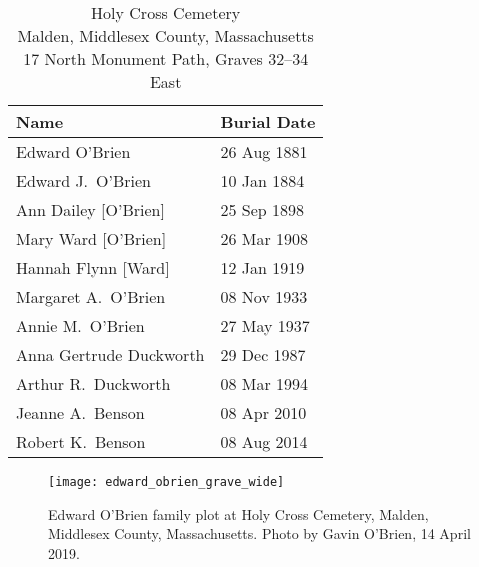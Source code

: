 \begin{table}[ht]
	\centering
	\caption{Holy Cross Cemetery\cite{HolyCrossPlot} \\
		Malden, Middlesex County, Massachusetts
		17 North Monument Path, Graves 32--34 East}
	\begin{tabular}{|l|l|}
		\hline
		\textbf{Name} & \textbf{Burial Date} \\
	\hline
	Edward O'Brien\index{O'Brien!Edward/Edmund\textsuperscript{2}} & 26 Aug 1881 \\
	\hline
	Edward J.\ O'Brien\index{O'Brien!Edward\textsuperscript{3} (1861--1884)} & 10 Jan 1884 \\
	\hline
	Ann Dailey [O'Brien]\index{O'Brien!Ann\textsuperscript{2}}\index{Dailey!Ann\textsuperscript{2} (O'Brien)} & 25 Sep 1898 \\
	\hline
	Mary Ward [O'Brien]\index{O'Brien!Mary\textsuperscript{2}}\index{Ward!Mary\textsuperscript{2} (O'Brien)} & 26 Mar 1908 \\
	\hline
	Hannah Flynn [Ward]\index{Ward!Hannah/Hanora\textsuperscript{3}}\index{Flynn!Hannah/Hanora\textsuperscript{3} (Ward)} & 12 Jan 1919 \\
	\hline
	Margaret A.\ O'Brien\index{O'Brien!Margaret A.\textsuperscript{3} (1859--1933)} & 08 Nov 1933 \\
	\hline
	Annie M.\ O'Brien\index{O'Brien!Ann\textsuperscript{3}} & 27 May 1937 \\
	\hline
	Anna Gertrude Duckworth\index{Duckworth!Anna Gertrude} & 29 Dec 1987 \\
	\hline
	Arthur R.\ Duckworth\index{Duckworth!Arthur R.} & 08 Mar 1994 \\
	\hline
	Jeanne A.\ Benson\index{Benson!Jeanne A.} & 08 Apr 2010 \\
	\hline
	Robert K.\ Benson\index{Benson!Robert K.} & 08 Aug 2014 \\
	\hline
	\end{tabular}
\end{table}

\begin{figure}
	\centering
	\texttt{[image: edward\_obrien\_grave\_wide]}
	\caption{Edward O'Brien family plot at Holy Cross Cemetery, Malden, Middlesex County, Massachusetts. Photo by Gavin O'Brien, 14 April 2019.}
\end{figure}

